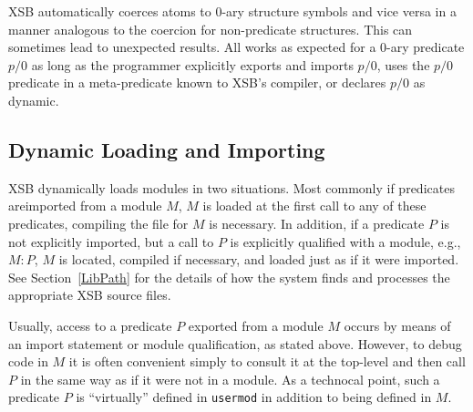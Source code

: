 XSB automatically coerces atoms to 0-ary structure symbols and vice
versa in a manner analogous to the coercion for non-predicate
structures.
This can sometimes lead to unexpected results.  All works as expected
for a 0-ary predicate $p/0$ as long as the programmer explicitly
exports and imports $p/0$, uses the $p/0$ predicate in a
meta-predicate known to XSB's compiler, or declares $p/0$ as dynamic.

\subsection{Dynamic Loading and Importing} 

XSB dynamically loads modules in two situations.  Most commonly if
predicates areimported from a module $M$, $M$ is loaded at the first
call to any of these predicates, compiling the file for $M$ is
necessary.  In addition, if a predicate $P$ is not explicitly
imported, but a call to $P$ is explicitly qualified with a module,
e.g., $M:P$, $M$ is located, compiled if necessary, and loaded just as
if it were imported.  See Section~\ref{LibPath} for the details of how
the system finds and processes the appropriate XSB source files.

Usually, access to a predicate $P$ exported from a module $M$ occurs
by means of an import statement or module qualification, as stated
above.  However, to debug code in $M$ it is often convenient simply to
consult it at the top-level and then call $P$ in the same way as if it
were not in a module.
As a technocal point, such a predicate $P$ is ``virtually'' defined in
{\tt usermod} in addition to being defined in $M$.


